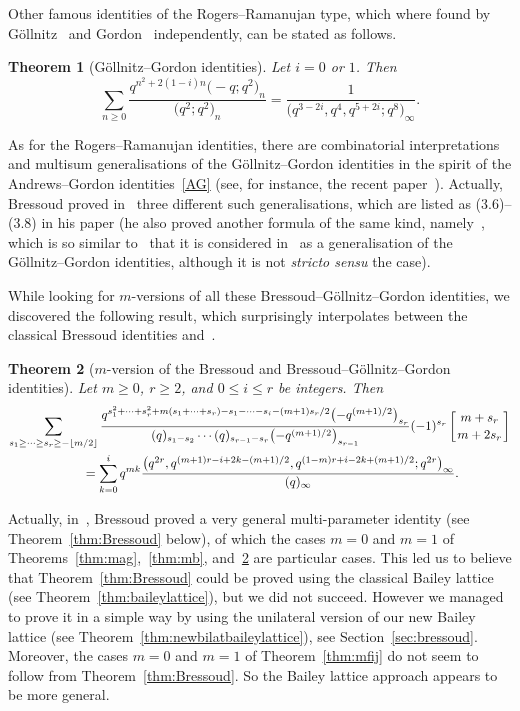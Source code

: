 \documentclass[pdftex]{sigma}
\numberwithin{equation}{section}
\newtheorem{Theorem}{Theorem}[section]
\begin{document}
Other famous identities of the Rogers--Ramanujan type, which where found by G\"ollnitz~\cite{Gol} and Gordon~\cite{Go65} independently, can be stated as follows.
\begin{Theorem}[G\"ollnitz--Gordon identities]
 \label{th:GG}
 Let $i=0$ or $1$. Then
\begin{equation*}
 \sum_{n \geq 0} \frac{q^{n^2+ 2(1-i)n}\bigl(-q;q^2\bigr)_n}{\bigl(q^2;q^2\bigr)_n} = \frac{1}{\bigl(q^{3-2i},q^4,q^{5+2i};q^8\bigr)_{\infty}}.
\end{equation*}
\end{Theorem}

As for the Rogers--Ramanujan identities, there are combinatorial interpretations and multisum generalisations of the G\"ollnitz--Gordon identities in the spirit of the Andrews--Gordon identities~\eqref{AG} (see, for instance, the recent paper~\cite{HZ}). Actually, Bressoud proved in~\cite{Br80} three different such generalisations, which are listed as (3.6)--(3.8) in his paper (he also proved another formula of the same kind, namely~\cite[equation (3.9)]{Br80}, which is so similar to~\cite[equation (3.8)]{Br80} that it is considered in~\cite{HZ} as a generalisation of the G\"ollnitz--Gordon identities, although it is not \emph{stricto sensu} the case).

While looking for $m$-versions of all these Bressoud--G\"ollnitz--Gordon identities, we discovered the following result, which surprisingly interpolates between the classical Bressoud identities and~\cite[equation (3.6)]{Br80}.

\begin{Theorem}[$m$-version of the Bressoud and Bressoud--G\"ollnitz--Gordon identities]\label{thm:mbr-3.6}
Let ${m\geq 0}$, $r \geq 2$, and $0 \leq i \leq r$ be integers. Then
\begin{gather}
\sum_{s_1\geq\dots\geq s_{r}\geq-\left\lfloor m/2\right\rfloor}\frac{q^{s_1^2+\dots+s_{r}^2+m(s_1+\dots+s_{r})-s_1-\dots-s_{i}-(m+1)s_r/2}\bigl(-q^{(m+1)/2}\bigr)_{s_{r}}}{(q)_{s_1-s_2}\cdots(q)_{s_{r-1}-s_{r}}\bigl(-q^{(m+1)/2}\bigr)_{s_{r-1}}}(-1)^{s_r}\left[{m+s_r\atop m+2s_r}\right]\nonumber\\
\qquad=\sum_{k=0}^{i}q^{mk}\frac{\bigl(q^{2r},q^{(m+1)r-i+2k-(m+1)/2},q^{(1-m)r+i-2k+(m+1)/2};q^{2r}\bigr)_\infty}{(q)_\infty}.\label{mbr-3.6}
\end{gather}
\end{Theorem}

Actually, in~\cite{Br80}, Bressoud proved a very general multi-parameter identity (see Theorem~\ref{thm:Bressoud} below), of which the cases $m=0$ and $m=1$ of Theorems~\ref{thm:mag},~\ref{thm:mb}, and~\ref{thm:mbr-3.6} are particular cases. This led us to believe that Theorem~\ref{thm:Bressoud} could be proved using the classical Bailey lattice (see Theorem~\ref{thm:baileylattice}), but we did not succeed. However we managed to prove it in a simple way by using the unilateral version of our new Bailey lattice (see Theorem~\ref{thm:newbilatbaileylattice}), see Section~\ref{sec:bressoud}.
Moreover, the cases $m=0$ and $m=1$ of Theorem~\ref{thm:mfij} do not seem to follow from Theorem~\ref{thm:Bressoud}. So the Bailey lattice approach appears to be more general.
\end{document}
